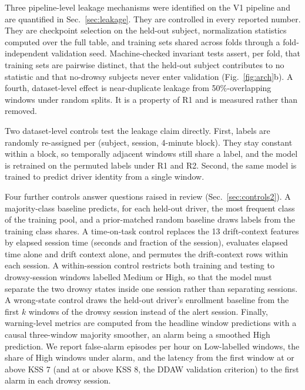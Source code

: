 \documentclass[journal]{IEEEtran}
\newcommand{\rone}{R1}
\newcommand{\rtwo}{R2}
\begin{document}
Three pipeline-level leakage mechanisms were identified on the V1 pipeline
and are quantified in Sec.~\ref{sec:leakage}. They are controlled in every
reported number. They are checkpoint selection on the held-out subject,
normalization statistics computed over the full table, and training sets
shared across folds through a fold-independent validation seed.
Machine-checked invariant tests assert, per fold, that training sets are
pairwise distinct, that the held-out subject contributes to no statistic and
that no-drowsy subjects never enter validation (Fig.~\ref{fig:arch}b). A
fourth, dataset-level effect is near-duplicate leakage from 50\%-overlapping
windows under random splits. It is a property of \rone{} and is measured
rather than removed.

Two dataset-level controls test the leakage claim directly. First, labels are
randomly re-assigned per (subject, session, 4-minute block). They stay
constant within a block, so temporally adjacent windows still share a label,
and the model is retrained on the permuted labels under \rone{} and \rtwo.
Second, the same model is trained to predict driver identity from a single
window.

Four further controls answer questions raised in review
(Sec.~\ref{sec:controls2}). A majority-class baseline predicts, for each
held-out driver, the most frequent class of the training pool, and a
prior-matched random baseline draws labels from the training class shares.
A time-on-task control replaces the 13 drift-context features by elapsed
session time (seconds and fraction of the session), evaluates elapsed time
alone and drift context alone, and permutes the drift-context rows within
each session. A within-session control restricts both training and testing
to drowsy-session windows labelled Medium or High, so that the model must
separate the two drowsy states inside one session rather than separating
sessions. A wrong-state control draws the held-out driver's enrollment
baseline from the first $k$ windows of the drowsy session instead of the
alert session. Finally, warning-level metrics are computed from the headline
window predictions with a causal three-window majority smoother, an alarm
being a smoothed High prediction. We report false-alarm episodes per hour on
Low-labelled windows, the share of High windows under alarm, and the latency
from the first window at or above KSS 7 (and at or above KSS 8, the DDAW
validation criterion) to the first alarm in each drowsy session.
\end{document}

